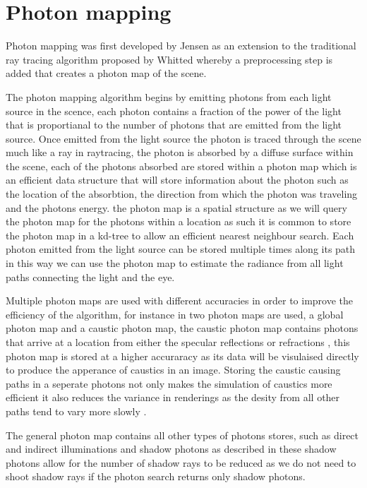 \section{Photon mapping}
Photon mapping was first developed by Jensen \cite{Jensen95b} as an extension to the traditional ray
tracing algorithm proposed by Whitted \cite{whitted79a} whereby a preprocessing step is added that
creates a photon map of the scene.

The photon mapping algorithm begins by emitting photons from each light source in the scence,
each photon contains a fraction of the power of the light that is proportianal to the number
of photons that are emitted from the light source. Once emitted from the light source the
photon is traced through the scene much like a ray in raytracing, 
the photon is absorbed by a diffuse surface within the scene, each of the photons absorbed are stored within a photon map
which is an efficient data structure that will store information about the photon such as the
location of the absorbtion, the direction from which the photon was traveling and the photons
energy. the photon map is a spatial structure as we will query the photon map for the photons
within a location as such it is common to store the photon map in a kd-tree to allow an efficient
nearest neighbour search. Each photon emitted from the light source can be stored multiple times
along its path in this way we can use the photon map to estimate the radiance from all light
paths connecting the light and the eye.

Multiple photon maps are used with different accuracies in order to
improve the efficiency of the algorithm, for instance in \cite{Jensen96a} two photon maps are used, a global photon
map and a caustic photon map, the caustic photon map contains photons that arrive at a location from
either the specular reflections or refractions , this photon map is stored at a higher
accuraracy as its data will be visulaised directly to produce the apperance of caustics in an image.
Storing the caustic causing paths in a seperate photons not only makes the simulation of caustics
more efficient it also reduces the variance in renderings as the desity from all other paths
tend to vary more slowly \cite{JensenBook}.

The general photon map contains all other types of photons stores, such as direct and indirect
illuminations and shadow photons as described in \cite{Jensen95c,Jensen96a} these shadow photons
allow for the number of shadow rays to be reduced as we do not need to shoot shadow rays if the
photon search returns only shadow photons.

